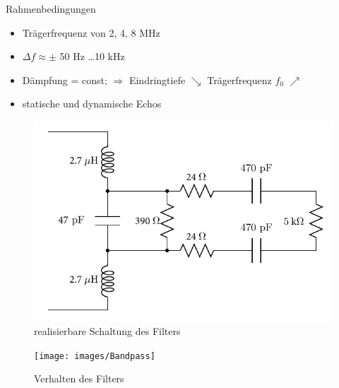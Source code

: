 \documentclass{beamer}
\begin{document}
\begin{frame}
\begin{block}{Rahmenbedingungen}
\begin{itemize}
	\item Trägerfrequenz von 2, 4, 8 MHz
	\item $\Delta f \approx \pm$ 50 Hz \ldots 10 kHz
	\item Dämpfung = const; $\Rightarrow$ Eindringtiefe $\searrow$ Trägerfrequenz $f_0$ $\nearrow$
	\item statische und dynamische Echos
\end{itemize}
\end{block}
\end{frame}

\begin{frame}
\begin{figure}
			\centering
		   	\includegraphics[width=\textwidth]{images/Bandpass/full}
	    		\caption{realisierbare Schaltung des Filters}
	    		\label{fig:filter_full}
	\end{figure}
\end{frame}
\begin{frame}
			\begin{figure}
			\texttt{[image: images/Bandpass]}
		    \caption{Verhalten des Filters}
		    \label{fig:filter_verhalten}
			\end{figure}
\end{frame}
\end{document}
